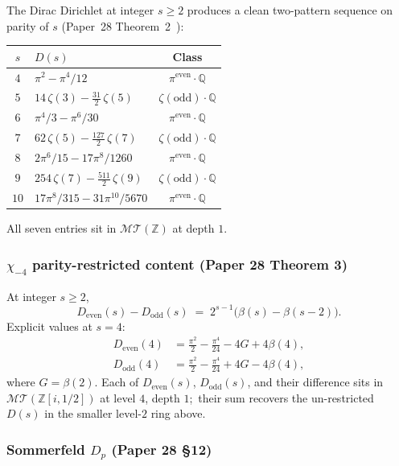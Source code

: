 \documentclass[11pt,a4paper]{article}
\theoremstyle{plain}
\theoremstyle{definition}
\newcommand{\Z}{\mathbb{Z}}
\newcommand{\Q}{\mathbb{Q}}
\newcommand{\MT}{\mathcal{MT}}
\begin{document}
The Dirac Dirichlet at integer $s \ge 2$ produces a clean two-pattern
sequence on parity of $s$ (Paper~28
Theorem~2~\cite{loutey_paper28}):

\begin{center}
\renewcommand{\arraystretch}{1.15}
\begin{tabular}{@{}clc@{}}
\toprule
$s$ & $D(s)$ & Class \\
\midrule
$4$ & $\pi^2 - \pi^4/12$ & $\pi^{\mathrm{even}}\cdot\Q$ \\
$5$ & $14\,\zeta(3) - \tfrac{31}{2}\,\zeta(5)$ & $\zeta(\mathrm{odd})\cdot\Q$ \\
$6$ & $\pi^4/3 - \pi^6/30$ & $\pi^{\mathrm{even}}\cdot\Q$ \\
$7$ & $62\,\zeta(5) - \tfrac{127}{2}\,\zeta(7)$ & $\zeta(\mathrm{odd})\cdot\Q$ \\
$8$ & $2\pi^6/15 - 17\pi^8/1260$ & $\pi^{\mathrm{even}}\cdot\Q$ \\
$9$ & $254\,\zeta(7) - \tfrac{511}{2}\,\zeta(9)$ & $\zeta(\mathrm{odd})\cdot\Q$ \\
$10$ & $17\pi^8/315 - 31\pi^{10}/5670$ & $\pi^{\mathrm{even}}\cdot\Q$ \\
\bottomrule
\end{tabular}
\end{center}

All seven entries sit in $\MT(\Z)$ at depth $1$.

\subsubsection{$\chi_{-4}$ parity-restricted content (Paper 28 Theorem 3)}

At integer $s \ge 2$,
\[
D_{\mathrm{even}}(s) - D_{\mathrm{odd}}(s) \;=\; 2^{s-1}\bigl(\beta(s) - \beta(s-2)\bigr).
\]
Explicit values at $s = 4$:
\begin{align*}
D_{\mathrm{even}}(4) &= \tfrac{\pi^2}{2} - \tfrac{\pi^4}{24} - 4G + 4\beta(4), \\
D_{\mathrm{odd}}(4)  &= \tfrac{\pi^2}{2} - \tfrac{\pi^4}{24} + 4G - 4\beta(4),
\end{align*}
where $G = \beta(2)$.  Each of $D_{\mathrm{even}}(s)$,
$D_{\mathrm{odd}}(s)$, and their difference sits in
$\MT(\Z[i, 1/2])$ at level $4$, depth $1$;\ their sum recovers the
un-restricted $D(s)$ in the smaller level-$2$ ring above.

\subsubsection{Sommerfeld $D_p$ (Paper 28 \S 12)}
\end{document}
